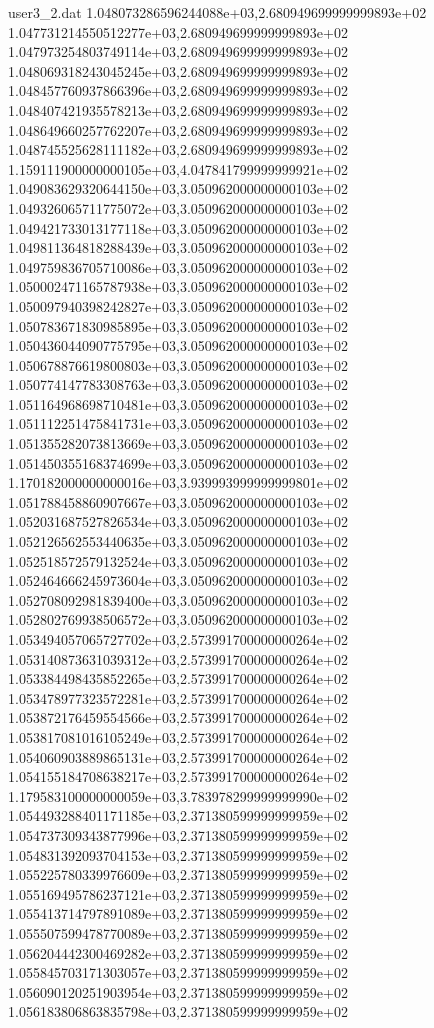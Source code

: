 \begin{filecontents}{user3_2.dat}
1.048073286596244088e+03,2.680949699999999893e+02
1.047731214550512277e+03,2.680949699999999893e+02
1.047973254803749114e+03,2.680949699999999893e+02
1.048069318243045245e+03,2.680949699999999893e+02
1.048457760937866396e+03,2.680949699999999893e+02
1.048407421935578213e+03,2.680949699999999893e+02
1.048649660257762207e+03,2.680949699999999893e+02
1.048745525628111182e+03,2.680949699999999893e+02
1.159111900000000105e+03,4.047841799999999921e+02
1.049083629320644150e+03,3.050962000000000103e+02
1.049326065711775072e+03,3.050962000000000103e+02
1.049421733013177118e+03,3.050962000000000103e+02
1.049811364818288439e+03,3.050962000000000103e+02
1.049759836705710086e+03,3.050962000000000103e+02
1.050002471165787938e+03,3.050962000000000103e+02
1.050097940398242827e+03,3.050962000000000103e+02
1.050783671830985895e+03,3.050962000000000103e+02
1.050436044090775795e+03,3.050962000000000103e+02
1.050678876619800803e+03,3.050962000000000103e+02
1.050774147783308763e+03,3.050962000000000103e+02
1.051164968698710481e+03,3.050962000000000103e+02
1.051112251475841731e+03,3.050962000000000103e+02
1.051355282073813669e+03,3.050962000000000103e+02
1.051450355168374699e+03,3.050962000000000103e+02
1.170182000000000016e+03,3.939993999999999801e+02
1.051788458860907667e+03,3.050962000000000103e+02
1.052031687527826534e+03,3.050962000000000103e+02
1.052126562553440635e+03,3.050962000000000103e+02
1.052518572579132524e+03,3.050962000000000103e+02
1.052464666245973604e+03,3.050962000000000103e+02
1.052708092981839400e+03,3.050962000000000103e+02
1.052802769938506572e+03,3.050962000000000103e+02
1.053494057065727702e+03,2.573991700000000264e+02
1.053140873631039312e+03,2.573991700000000264e+02
1.053384498435852265e+03,2.573991700000000264e+02
1.053478977323572281e+03,2.573991700000000264e+02
1.053872176459554566e+03,2.573991700000000264e+02
1.053817081016105249e+03,2.573991700000000264e+02
1.054060903889865131e+03,2.573991700000000264e+02
1.054155184708638217e+03,2.573991700000000264e+02
1.179583100000000059e+03,3.783978299999999990e+02
1.054493288401171185e+03,2.371380599999999959e+02
1.054737309343877996e+03,2.371380599999999959e+02
1.054831392093704153e+03,2.371380599999999959e+02
1.055225780339976609e+03,2.371380599999999959e+02
1.055169495786237121e+03,2.371380599999999959e+02
1.055413714797891089e+03,2.371380599999999959e+02
1.055507599478770089e+03,2.371380599999999959e+02
1.056204442300469282e+03,2.371380599999999959e+02
1.055845703171303057e+03,2.371380599999999959e+02
1.056090120251903954e+03,2.371380599999999959e+02
1.056183806863835798e+03,2.371380599999999959e+02

\end{filecontents}
